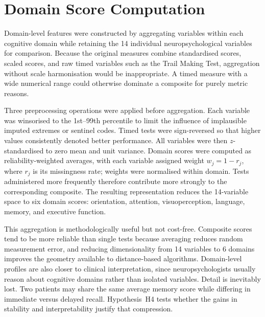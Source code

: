 
\section{Domain Score Computation}\label{sec:domain_scores}

Domain-level features were constructed by aggregating variables within each cognitive domain while retaining the 14 individual neuropsychological variables for comparison. Because the original measures combine standardised scores, scaled scores, and raw timed variables such as the Trail Making Test, aggregation without scale harmonisation would be inappropriate. A timed measure with a wide numerical range could otherwise dominate a composite for purely metric reasons.

Three preprocessing operations were applied before aggregation. Each variable was winsorised to the 1st--99th percentile to limit the influence of implausible imputed extremes or sentinel codes. Timed tests were sign-reversed so that higher values consistently denoted better performance. All variables were then $z$-standardised to zero mean and unit variance. Domain scores were computed as reliability-weighted averages, with each variable assigned weight $w_j = 1 - r_j$, where $r_j$ is its missingness rate; weights were normalised within domain. Tests administered more frequently therefore contribute more strongly to the corresponding composite. The resulting representation reduces the 14-variable space to six domain scores: orientation, attention, visuoperception, language, memory, and executive function.

This aggregation is methodologically useful but not cost-free. Composite scores tend to be more reliable than single tests because averaging reduces random measurement error, and reducing dimensionality from 14 variables to 6 domains improves the geometry available to distance-based algorithms. Domain-level profiles are also closer to clinical interpretation, since neuropsychologists usually reason about cognitive domains rather than isolated variables. Detail is inevitably lost. Two patients may share the same average memory score while differing in immediate versus delayed recall. Hypothesis~H4 tests whether the gains in stability and interpretability justify that compression.


